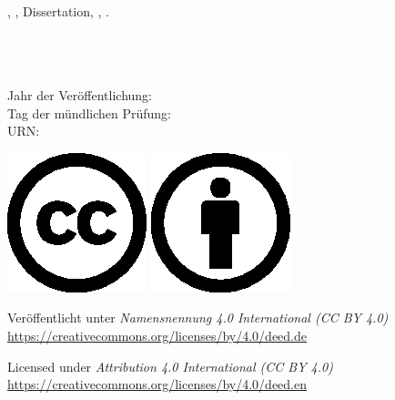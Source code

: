 

\thispagestyle{empty}

\ \vfill

\noindent%
\myName{}, \emph{\myTitle{}}, Dissertation, \myUni{}, \myYearPublication{}.

\bigskip

\begin{otherlanguage}{ngerman}

\noindent%
\myDepartmentDE{} \\
\myFacultyDE{} \\
\myUni{} \\
Jahr der Veröffentlichung: \myYearPublication{} \\
Tag der mündlichen Prüfung: \myTimePresent{} \\
URN:  \\

\bigskip

\noindent%
\includegraphics[height=4ex]{gfx/logos/creativecommons/cc}
\includegraphics[height=4ex]{gfx/logos/creativecommons/by}

\smallskip

\noindent%
Veröffentlicht unter \emph{Namensnennung 4.0 International (CC BY 4.0)} \\
\url{https://creativecommons.org/licenses/by/4.0/deed.de}

\end{otherlanguage}

\smallskip

\noindent%
Licensed under \emph{Attribution 4.0 International (CC BY 4.0)} \\
\url{https://creativecommons.org/licenses/by/4.0/deed.en}
